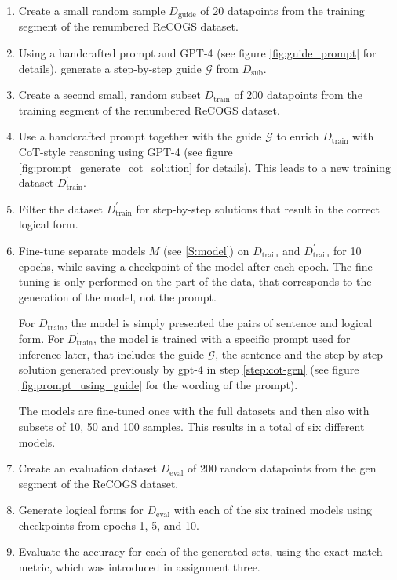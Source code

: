 \documentclass[11pt]{article}
\begin{document}
    \begin{enumerate}
        \item Create a small random sample $D_\mathrm{guide}$ of 20 datapoints from the training segment of the renumbered ReCOGS dataset.

        \item\label{step:gpt4_guide} Using a handcrafted prompt and GPT-4 (see figure \ref{fig:guide_prompt} for details), generate a step-by-step guide $\mathcal{G}$ from $D_\mathrm{sub}$.

        \item Create a second small, random subset $D_\mathrm{train}$ of 200 datapoints from the training segment of the renumbered ReCOGS dataset.

        \item\label{step:cot-gen} Use a handcrafted prompt together with the guide $\mathcal{G}$ to enrich $D_\mathrm{train}$
        with CoT-style reasoning using GPT-4 (see figure \ref{fig:prompt_generate_cot_solution} for details).
        This leads to a new training dataset $D_\mathrm{train}^\prime$.

        \item Filter the dataset $D_\mathrm{train}^\prime$ for step-by-step solutions that result in the correct logical form.

        \item Fine-tune separate models $M$ (see \ref{S:model}) on $D_\mathrm{train}$ and $D_\mathrm{train}^\prime$ for 10 epochs, while
        saving a checkpoint of the model after each epoch.
        The fine-tuning is only performed on the part of the data, that corresponds to the generation of the model, not the prompt.

        For $D_\mathrm{train}$, the model is simply presented the pairs of sentence and logical form.
        For $D_\mathrm{train}^\prime$, the model is trained with a specific prompt used for inference later, that includes the
        guide $\mathcal{G}$, the sentence and the step-by-step solution generated previously by gpt-4 in step \ref{step:cot-gen}
        (see figure \ref{fig:prompt_using_guide} for the wording of the prompt).

        The models are fine-tuned once with the full datasets and then also with subsets of 10, 50 and 100 samples.
        This results in a total of six different models.

        \item Create an evaluation dataset $D_\mathrm{eval}$ of 200 random datapoints from the gen segment of the ReCOGS dataset.

        \item Generate logical forms for $D_\mathrm{eval}$ with each of the six trained models using checkpoints from epochs 1, 5, and 10.

        \item Evaluate the accuracy for each of the generated sets, using the exact-match metric, which was introduced in
        assignment three.
%
    \end{enumerate}
\end{document}
